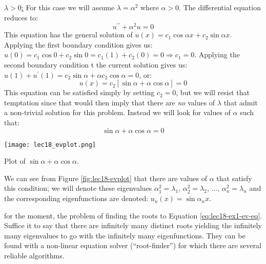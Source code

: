 \vspace{0.5cm}

\noindent\underline{$\lambda > 0$:} For this case we will assume $\lambda = \alpha^2$ where $\alpha > 0$.  The differential equation reduces to:
\begin{equation*}
u^{\prime \prime} + \alpha^2 u = 0
\end{equation*}
This equation has the general solution of $u(x) = c_1 \cos{\alpha x} + c_2 \sin{\alpha x}$.  Applying the first boundary condition gives us: $u(0) = c_1 \cos{0} + c_2 \sin{0} = c_1(1) + c_2(0) = 0 \Rightarrow c_1 = 0$.  Applying the second boundary condition t the current solution gives us: $u(1) + u^{\prime}(1) = c_2 \sin{\alpha} + \alpha c_2 \cos{\alpha} = 0$, or:
\begin{equation}
u(x) = c_2\left[\sin{\alpha} + \alpha \cos{\alpha}\right] = 0
\label{eq:lec18-ex1}
\end{equation}
This equation can be satisfied simply by setting $c_2 = 0$, but we will resist that temptation since that would then imply that there are \emph{no} values of $\lambda$ that admit a non-trivial solution for this problem.  Instead we will look for values of $\alpha$ such that:
\begin{equation}
\sin{\alpha} + \alpha \cos{\alpha} = 0
\label{eq:lec18-ex1-ev-eq}
\end{equation}
\begin{marginfigure}
\texttt{[image: lec18\_evplot.png]}
\caption{Plot of $\sin{\alpha} + \alpha \cos{\alpha}$.}
\label{fig:lec18-evplot}
\end{marginfigure}
We can see from Figure \ref{fig:lec18-evplot} that there are values of $\alpha$ that satisfy this condition; we will denote these eigenvalues $\alpha_1^2 = \lambda_1$, $\alpha_2^2 = \lambda_2$, $\dots$, $\alpha_n^2 = \lambda_n$ and the corresponding eigenfunctions are denoted: $u_n(x) = \sin{\alpha_n x}$.

 for the moment, the problem of finding the roots to Equation \ref{eq:lec18-ex1-ev-eq}. Suffice it to say that there are infinitely many distinct roots yielding the infinitely many eigenvalues to go with the infinitely many eigenfunctions. They can be found with a non-linear equation solver (``root-finder'') for which there are several reliable algorithms.

